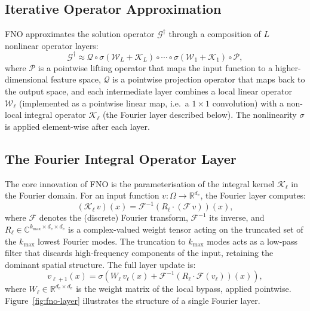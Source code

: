 \subsection{Iterative Operator Approximation}

FNO approximates the solution operator $\mathcal{G}^\dagger$ through a composition of $L$ nonlinear operator layers:
\begin{equation}
  \mathcal{G}^\dagger \approx \mathcal{Q} \circ \sigma(\mathcal{W}_L + \mathcal{K}_L) \circ \cdots \circ \sigma(\mathcal{W}_1 + \mathcal{K}_1) \circ \mathcal{P},
\end{equation}
where $\mathcal{P}$ is a pointwise lifting operator that maps the input function to a higher-dimensional feature space, $\mathcal{Q}$ is a pointwise projection operator that maps back to the output space, and each intermediate layer combines a local linear operator $\mathcal{W}_\ell$ (implemented as a pointwise linear map, i.e.\ a $1\times1$ convolution) with a non-local integral operator $\mathcal{K}_\ell$ (the Fourier layer described below). The nonlinearity $\sigma$ is applied element-wise after each layer.

\subsection{The Fourier Integral Operator Layer}

The core innovation of FNO is the parameterisation of the integral kernel $\mathcal{K}_\ell$ in the Fourier domain. For an input function $v : \Omega \to \mathbb{R}^{d_v}$, the Fourier layer computes:
\begin{equation}
  (\mathcal{K}_\ell\, v)(x) = \mathcal{F}^{-1}\!\left( R_\ell \cdot (\mathcal{F}\, v) \right)(x),
\end{equation}
where $\mathcal{F}$ denotes the (discrete) Fourier transform, $\mathcal{F}^{-1}$ its inverse, and $R_\ell \in \mathbb{C}^{k_{\max} \times d_v \times d_v}$ is a complex-valued weight tensor acting on the truncated set of the $k_{\max}$ lowest Fourier modes. The truncation to $k_{\max}$ modes acts as a low-pass filter that discards high-frequency components of the input, retaining the dominant spatial structure. The full layer update is:
\begin{equation}
  v_{\ell+1}(x) = \sigma\!\left( W_\ell\, v_\ell(x) + \mathcal{F}^{-1}\!\left( R_\ell \cdot \mathcal{F}(v_\ell) \right)(x) \right),
\label{eq:fno-layer}
\end{equation}
where $W_\ell \in \mathbb{R}^{d_v \times d_v}$ is the weight matrix of the local bypass, applied pointwise. Figure~\ref{fig:fno-layer} illustrates the structure of a single Fourier layer.

